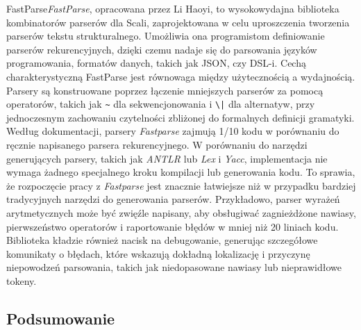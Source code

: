 FastParse\textit{FastParse}\cite{fastparse-docs}, opracowana przez Li Haoyi, to wysokowydajna biblioteka kombinatorów parserów dla Scali, zaprojektowana w celu uproszczenia tworzenia parserów tekstu strukturalnego.
Umożliwia ona programistom definiowanie parserów rekurencyjnych, dzięki czemu nadaje się do parsowania języków programowania, formatów danych, takich jak JSON, czy DSL-i.
Cechą charakterystyczną FastParse jest równowaga między użytecznością a wydajnością.
Parsery są konstruowane poprzez łączenie mniejszych parserów za pomocą operatorów, takich jak \verb&~& dla sekwencjonowania i \verb&\|& dla alternatyw, przy jednoczesnym zachowaniu czytelności zbliżonej do formalnych definicji gramatyki.
Według dokumentacji\cite{fastparse-docs}, parsery \textit{Fastparse} zajmują 1/10 kodu w porównaniu do ręcznie napisanego parsera rekurencyjnego.
W porównaniu do narzędzi generujących parsery, takich jak \textit{ANTLR} lub \textit{Lex} i \textit{Yacc}, implementacja nie wymaga żadnego specjalnego kroku kompilacji lub generowania kodu. To sprawia, że rozpoczęcie pracy z \textit{Fastparse} jest znacznie łatwiejsze niż w przypadku bardziej tradycyjnych narzędzi do generowania parserów. Przykładowo, parser wyrażeń arytmetycznych może być zwięźle napisany, aby obsługiwać zagnieżdżone nawiasy, pierwszeństwo operatorów i raportowanie błędów w mniej niż 20 liniach kodu\cite{fastparse-slides}. Biblioteka kładzie również nacisk na debugowanie, generując szczegółowe komunikaty o błędach, które wskazują dokładną lokalizację i przyczynę niepowodzeń parsowania, takich jak niedopasowane nawiasy lub nieprawidłowe tokeny.

\subsection{Podsumowanie}
\label{subsec:podsumowanie}

